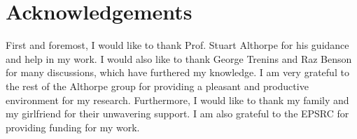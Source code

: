 \chapter*{Acknowledgements}
First and foremost, I would like to thank Prof. Stuart Althorpe for his guidance and help in my work. I would also like to thank George Trenins and Raz Benson for many discussions, which have furthered my knowledge. I am very grateful to the rest of the Althorpe group for providing a pleasant and productive environment for my research. Furthermore, I would like to thank my family and my girlfriend for their unwavering support. I am also grateful to the EPSRC for providing funding for my work.